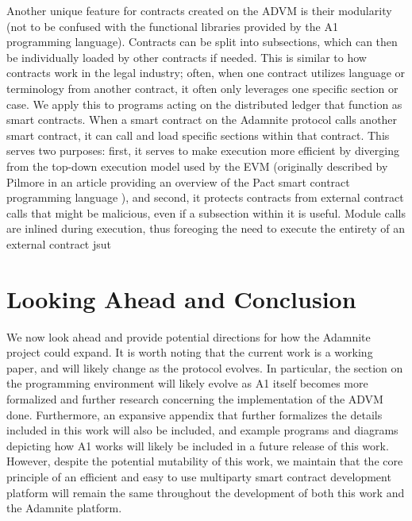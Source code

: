 \documentclass[conference]{IEEEtran}
\begin{document}
Another unique feature for contracts created on the ADVM is their modularity (not to be confused with the functional libraries provided by the A1 programming language). Contracts can be split into subsections, which can then be individually loaded by other contracts if needed. This is similar to how contracts work in the legal industry; often, when one contract utilizes language or terminology from another contract, it often only leverages one specific section or case. We apply this to programs acting on the distributed ledger that function as smart contracts. When a smart contract on the Adamnite protocol calls another smart contract, it can call and load specific sections within that contract. This serves two purposes: first, it serves to make execution more efficient by diverging from the  top-down execution model used by the EVM (originally described by Pilmore in an article providing an overview of  the Pact smart contract programming language \cite{pilmore2019EVM}), and second, it protects contracts from external contract calls that might be malicious, even if a subsection within it is useful. Module calls are inlined during execution, thus foreoging the need to execute the entirety of an external contract jsut 


\section{Looking Ahead and Conclusion}
We now look ahead and provide potential directions for how the Adamnite project could expand. It is worth noting that the current work is a working paper, and will likely change as the protocol evolves. In particular, the section on the programming environment will likely evolve as A1 itself becomes more formalized and further research concerning the implementation of the ADVM done. Furthermore, an expansive appendix that further formalizes the details included in this work will also be included, and example programs and diagrams depicting how A1 works will likely be included in a future release of this work. However, despite the potential mutability of this work, we maintain that the core principle of an efficient and easy to use multiparty smart contract development platform will remain the same throughout the development of both this work and the Adamnite platform. 
\end{document}
